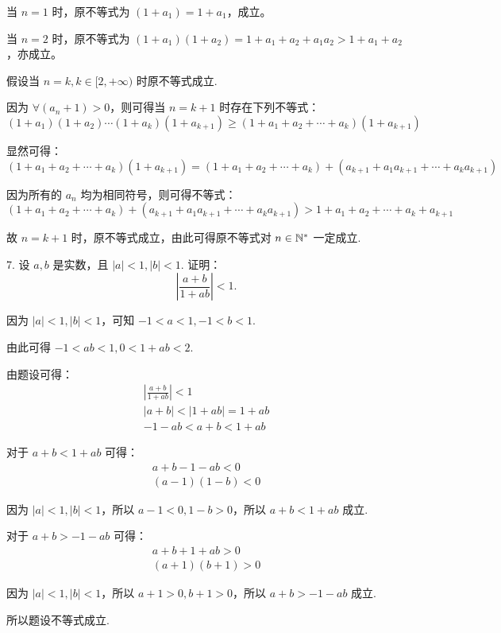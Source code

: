 \documentclass[12pt, a4paper, oneside, UTF8]{ctexbook}
\begin{document}
\begin{solution}
当 $n = 1$ 时，原不等式为 $(1 + a_1) = 1 + a_1$，成立。

当 $n = 2$ 时，原不等式为 $(1 + a_1)(1 + a_2) = 1 + a_1 + a_2 + a_1a_2 > 1 + a_1 + a_2$，亦成立。

假设当 $n = k, k \in [2, +\infty)$ 时原不等式成立.

因为 $\forall (a_n + 1) > 0$，则可得当 $n = k + 1$ 时存在下列不等式：
\[(1 + a_1)(1 + a_2) \cdots (1 + a_k)(1 + a_{k+1}) \geq (1 + a_1 + a_2 + \cdots + a_k)(1 + a_{k+1})\]

显然可得：
\[(1 + a_1 + a_2 + \cdots + a_k)(1 + a_{k+1}) = (1 + a_1 + a_2 + \cdots + a_k) + (a_{k+1} + a_{1}a_{k+1} + \cdots + a_{k}a_{k+1})\]

因为所有的 $a_n$ 均为相同符号，则可得不等式：
\[(1 + a_1 + a_2 + \cdots + a_k) + (a_{k+1} + a_{1}a_{k+1} + \cdots + a_{k}a_{k+1}) > 1 + a_1 + a_2 + \cdots + a_k + a_{k+1}\]

故 $n = k + 1$ 时，原不等式成立，由此可得原不等式对 $n \in \N+$ 一定成立.
\end{solution}

7. 设 $a, b$ 是实数，且 $|a| < 1, |b| < 1$. 证明：
\[ \left| \frac{a + b}{1 + ab} \right| < 1 \text{.} \]

\begin{solution}
因为 $|a| < 1, |b| < 1$，可知 $-1 < a < 1, -1 < b < 1$.

由此可得 $-1 < ab < 1, 0 < 1 + ab < 2$.

由题设可得：
\begin{gather*}
    \left| \frac{a + b}{1 + ab} \right| < 1\\
    |a + b| < |1 + ab| = 1 + ab\\
    - 1 - ab < a + b < 1 + ab
\end{gather*}

对于 $a + b < 1 + ab$ 可得：
\begin{gather*}
    a + b - 1 - ab < 0\\
    (a - 1)(1 - b) < 0
\end{gather*}

因为 $|a| < 1, |b| < 1$，所以 $a - 1 < 0, 1 - b > 0$，所以 $a + b < 1 + ab$ 成立.

对于 $a + b > -1 - ab$ 可得：
\begin{gather*}
    a + b + 1 + ab > 0\\
    (a + 1)(b + 1) > 0
\end{gather*}

因为 $|a| < 1, |b| < 1$，所以 $a + 1 > 0, b + 1 > 0$，所以 $a + b > -1 - ab$ 成立.

所以题设不等式成立.
\end{solution}

\ifx\allfiles\undefined
\end{document}
